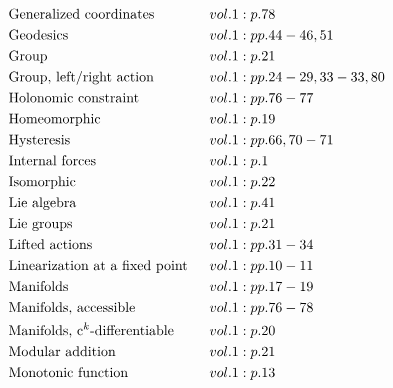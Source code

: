 \documentclass[a4paper]{article}
\begin{document}
\begin{align*}
&\text{Generalized coordinates} \hspace*{0.55556em}&& vol. 1: p. 78\\
&\text{Geodesics} \hspace*{0.55556em}&& vol. 1: pp. 44-46, 51\\
&\text{Group} \hspace*{0.55556em}&& vol. 1: p. 21\\
&\text{Group, left/right action} \hspace*{0.55556em}&& vol. 1: pp. 24-29, 33-33, 80\\
&\text{Holonomic constraint} \hspace*{0.55556em}&& vol. 1: pp. 76-77\\
&\text{Homeomorphic} \hspace*{0.55556em}&& vol. 1: p. 19\\
&\text{Hysteresis} \hspace*{0.55556em}&& vol. 1: pp. 66, 70-71\\
&\text{Internal forces} \hspace*{0.55556em}&& vol. 1: p. 1\\
&\text{Isomorphic} \hspace*{0.55556em}&& vol. 1: p. 22\\
&\text{Lie algebra} \hspace*{0.55556em}&& vol. 1: p. 41\\
&\text{Lie groups} \hspace*{0.55556em}&& vol. 1: p. 21\\
&\text{Lifted actions} \hspace*{0.55556em}&& vol. 1: pp. 31-34\\
&\text{Linearization at a fixed point} \hspace*{0.55556em}&& vol. 1: pp. 10-11\\
&\text{Manifolds} \hspace*{0.55556em}&& vol. 1: pp. 17-19\\
&\text{Manifolds, accessible} \hspace*{0.55556em}&& vol. 1: pp. 76-78\\
&\text{Manifolds, c$^k$-differentiable} \hspace*{0.55556em}&& vol. 1: p. 20\\
&\text{Modular addition} \hspace*{0.55556em}&& vol. 1: p. 21\\
&\text{Monotonic function} \hspace*{0.55556em}&& vol. 1: p. 13\\

\end{align*}
\end{document}

